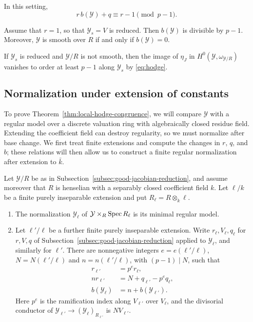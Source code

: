 \begin{theorem}\label{thm:local-hodge-congruence}
In this setting,
\begin{equation}\label{eq:local-hodge-congruence}
  r\,b(\mathcal Y)+q\equiv r-1\pmod{p-1}.
\end{equation}
\end{theorem}

\begin{corollary}\label{lem:congruence}
Assume that $r = 1$, so that $\mathcal Y_s = V$ is reduced.
Then $b(\mathcal Y)$ is divisible by $p-1$.
Moreover, $\mathcal Y$ is smooth over $R$ if and only if $b(\mathcal Y) = 0$.
\end{corollary}

If $\mathcal Y_s$ is reduced and $\mathcal Y/R$ is not smooth, then the image of $\eta_J$ in $H^0(\mathcal Y,\omega_{\mathcal Y/R})$ vanishes to order at least $p-1$ along $\mathcal Y_s$ by \eqref{eq:hodge}.

\subsection{Normalization under extension of constants}
To prove Theorem~\ref{thm:local-hodge-congruence}, we will compare $\mathcal Y$ with a regular model over a discrete valuation ring with algebraically closed residue field.
Extending the coefficient field can destroy regularity, so we must normalize after base change.
We first treat finite extensions and compute the changes in $r$, $q$, and $b$; these relations will then allow us to construct a finite regular normalization after extension to $\bar k$.

\begin{lemma}\label{lem:local-normalization}
Let $\mathcal Y/R$ be as in Subsection~\ref{subsec:good-jacobian-reduction}, and assume moreover that $R$ is henselian with a separably closed coefficient field $k$.
Let $\ell/k$ be a finite purely inseparable extension and put $R_{\ell} = R\otimes_k \ell$.
\begin{enumerate}
\item The normalization $\mathcal Y_{\ell}$ of $\mathcal Y\times_R\operatorname{Spec} R_{\ell}$ is its minimal regular model.
\item Let $\ell'/\ell$ be a further finite purely inseparable extension.
Write $r_{\ell},V_{\ell},q_{\ell}$ for $r,V,q$ of Subsection~\ref{subsec:good-jacobian-reduction} applied to $\mathcal Y_{\ell}$, and similarly for $\ell'$.
There are nonnegative integers $e = e(\ell'/\ell)$, $N = N(\ell'/\ell)$ and $n = n(\ell'/\ell)$, with $(p-1)\mid N$, such that
\begin{align}
  r_{\ell'}&=p^e r_{\ell},\label{eq:local-multiplicity-change}\\
  n r_{\ell'}&=N+q_{\ell'}-p^e q_{\ell},\label{eq:local-canonical-change}\\
  b(\mathcal Y_{\ell})&=n+b(\mathcal Y_{\ell'}).\label{eq:local-hodge-change}
\end{align}
Here $p^e$ is the ramification index along $V_{\ell'}$ over $V_{\ell}$, and the divisorial conductor of $\mathcal Y_{\ell'}\to(\mathcal Y_{\ell})_{R_{\ell'}}$ is $NV_{\ell'}$.
\end{enumerate}
\end{lemma}

